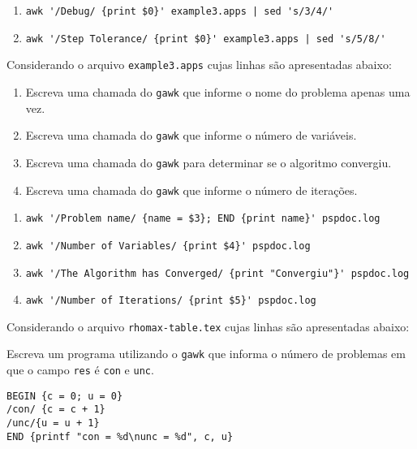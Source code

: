 \begin{Answer}[ref={0004}]
  \begin{enumerate}
    \item \lstinline+awk '/Debug/ {print $0}' example3.apps | sed 's/3/4/'+
    \item \lstinline+awk '/Step Tolerance/ {print $0}' example3.apps | sed 's/5/8/'+
  \end{enumerate}
\end{Answer}
\begin{Exercise}[label={0005}, difficulty={1}, origin={gawk}]
  Considerando o arquivo \lstinline+example3.apps+ cujas linhas são
  apresentadas abaixo:
  
  \begin{enumerate}
    \item Escreva uma chamada do \lstinline+gawk+ que informe o nome do
      problema apenas uma vez.
    \item Escreva uma chamada do \lstinline+gawk+ que informe o número de
      variáveis.
    \item Escreva uma chamada do \lstinline+gawk+ para determinar se o algoritmo
      convergiu.
    \item Escreva uma chamada do \lstinline+gawk+ que informe o número de
      iterações.
  \end{enumerate}
\end{Exercise}
\begin{Answer}[ref={0005}]
  \begin{enumerate}
    \item \lstinline+awk '/Problem name/ {name = $3}; END {print name}' pspdoc.log+
    \item \lstinline+awk '/Number of Variables/ {print $4}' pspdoc.log+
    \item \lstinline+awk '/The Algorithm has Converged/ {print "Convergiu"}' pspdoc.log+
    \item \lstinline+awk '/Number of Iterations/ {print $5}' pspdoc.log+
  \end{enumerate}
\end{Answer}
\begin{Exercise}[label={0006}, difficulty={2}, origin={gawk}]
  Considerando o arquivo \lstinline+rhomax-table.tex+ cujas linhas são
  apresentadas abaixo:
  
  Escreva um programa utilizando o \lstinline+gawk+ que informa o número de
  problemas em que o campo \lstinline+res+ é \lstinline+con+ e \lstinline+unc+.
\end{Exercise}
\begin{Answer}[ref={0006}]
  \begin{lstlisting}
BEGIN {c = 0; u = 0}
/con/ {c = c + 1}
/unc/{u = u + 1}
END {printf "con = %d\nunc = %d", c, u}
  \end{lstlisting}
\end{Answer}
